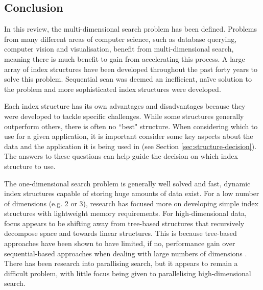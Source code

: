 \subsection{Conclusion}

In this review, the multi-dimensional search problem has been defined. Problems from many different areas of computer science, such as database querying, computer vision and visualisation, benefit from multi-dimensional search, meaning there is much benefit to gain from accelerating this process. A large array of index structures have been developed throughout the past forty years to solve this problem. Sequential scan was deemed an inefficient, na\"{i}ve solution to the problem and more sophisticated index structures were developed.

Each index structure has its own advantages and disadvantages because they were developed to tackle specific challenges. While some structures generally outperform others, there is often no ``best" structure. When considering which to use for a given application, it is important consider some key aspects about the data and the application it is being used in (see Section \ref{sec:structure-decision}). The answers to these questions can help guide the decision on which index structure to use.

The one-dimensional search problem is generally well solved and fast, dynamic index structures capable of storing huge amounts of data exist. For a low number of dimensions (e.g. 2 or 3), research has focused more on developing simple index structures with lightweight memory requirements. For high-dimensional data, focus appears to be shifting away from tree-based structures that recursively decompose space and towards linear structures. This is because tree-based approaches have been shown to have limited, if no, performance gain over sequential-based approaches when dealing with large numbers of dimensions \cite{md-structures-samet}. There has been research into parallising search, but it appears to remain a difficult problem, with little focus being given to parallelising high-dimensional search.
